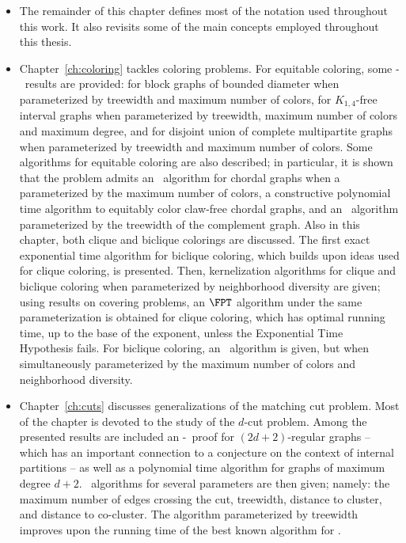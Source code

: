 \begin{itemize}
    \item The remainder of this chapter defines most of the notation used throughout this work.
    It also revisits some of the main concepts employed throughout this thesis.
    \item Chapter~\ref{ch:coloring} tackles coloring problems.
    For equitable coloring, some \W[1]-\Hness\ results are provided: for block graphs of bounded diameter when parameterized by treewidth and maximum number of colors, for $K_{1,4}$-free interval graphs when parameterized by treewidth, maximum number of colors and maximum degree, and for disjoint union of complete multipartite graphs when parameterized by treewidth and maximum number of colors.
    Some algorithms for equitable coloring are also described; in particular, it is shown that the problem admits an \XP\ algorithm for chordal graphs when a parameterized by the maximum number of colors, a constructive polynomial time algorithm to equitably color claw-free chordal graphs, and an \FPT\ algorithm parameterized by the treewidth of the complement graph.
    Also in this chapter, both clique and biclique colorings are discussed.
    The first exact exponential time algorithm for biclique coloring, which builds upon ideas used for clique coloring, is presented.
    Then, kernelization algorithms for clique and biclique coloring when parameterized by neighborhood diversity are given; using results on covering problems, an $\FPT$ algorithm under the same parameterization is obtained for clique coloring, which has optimal running time, up to the base of the exponent, unless the Exponential Time Hypothesis fails.
    For biclique coloring, an \FPT\ algorithm is given, but when simultaneously parameterized by the maximum number of colors and neighborhood diversity.
    \item Chapter~\ref{ch:cuts} discusses generalizations of the matching cut problem.
    Most of the chapter is devoted to the study of the  $d$-cut problem.
    Among the presented results are included an \NP-\Hness\ proof for $(2d+2)$-regular graphs -- which has an important connection to a conjecture on the context of internal partitions -- as well as a polynomial time algorithm for graphs of maximum degree $d + 2$.
    \FPT\ algorithms for several parameters are then given; namely: the maximum number of edges crossing the cut, treewidth, distance to cluster, and distance to co-cluster.
    The algorithm parameterized by treewidth improves upon the running time of the best known algorithm for .

\end{itemize}
